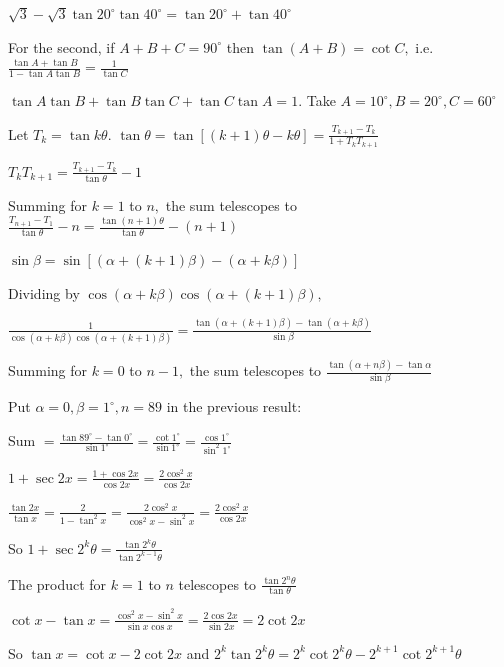   $\sqrt{3} - \sqrt{3}\tan 20^\circ\tan 40^\circ = \tan 20^\circ + \tan 40^\circ$

  For the second, if $A + B + C = 90^\circ$ then $\tan(A + B) = \cot C,$ i.e. $\frac{\tan A + \tan B}{1 - \tan A\tan B} =
  \frac{1}{\tan C}$

  $\tan A\tan B + \tan B\tan C + \tan C\tan A = 1.$ Take $A = 10^\circ, B = 20^\circ, C = 60^\circ$

\item Let $T_k = \tan k\theta.$ $\tan\theta = \tan[(k + 1)\theta - k\theta] = \frac{T_{k + 1} - T_k}{1 + T_kT_{k + 1}}$

  $T_kT_{k + 1} = \frac{T_{k + 1} - T_k}{\tan\theta} - 1$

  Summing for $k = 1$ to $n,$ the sum telescopes to $\frac{T_{n + 1} - T_1}{\tan\theta} - n = \frac{\tan(n +
  1)\theta}{\tan\theta} - (n + 1)$

\item $\sin\beta = \sin[(\alpha + (k + 1)\beta) - (\alpha + k\beta)]$

  Dividing by $\cos(\alpha + k\beta)\cos(\alpha + (k + 1)\beta),$

  $\frac{1}{\cos(\alpha + k\beta)\cos(\alpha + (k + 1)\beta)} = \frac{\tan(\alpha + (k + 1)\beta) - \tan(\alpha +
  k\beta)}{\sin\beta}$

  Summing for $k = 0$ to $n - 1,$ the sum telescopes to $\frac{\tan(\alpha + n\beta) - \tan\alpha}{\sin\beta}$

\item Put $\alpha = 0, \beta = 1^\circ, n = 89$ in the previous result:

  Sum $= \frac{\tan 89^\circ - \tan 0^\circ}{\sin 1^\circ} = \frac{\cot 1^\circ}{\sin 1^\circ} = \frac{\cos
  1^\circ}{\sin^2 1^\circ}$

\item $1 + \sec 2x = \frac{1 + \cos 2x}{\cos 2x} = \frac{2\cos^2 x}{\cos 2x}$

  $\frac{\tan 2x}{\tan x} = \frac{2}{1 - \tan^2 x} = \frac{2\cos^2 x}{\cos^2 x - \sin^2 x} = \frac{2\cos^2 x}{\cos 2x}$

  So $1 + \sec 2^k\theta = \frac{\tan 2^k\theta}{\tan 2^{k - 1}\theta}$

  The product for $k = 1$ to $n$ telescopes to $\frac{\tan 2^n\theta}{\tan\theta}$

\item $\cot x - \tan x = \frac{\cos^2 x - \sin^2 x}{\sin x\cos x} = \frac{2\cos 2x}{\sin 2x} = 2\cot 2x$

  So $\tan x = \cot x - 2\cot 2x$ and $2^k\tan 2^k\theta = 2^k\cot 2^k\theta - 2^{k + 1}\cot 2^{k + 1}\theta$


